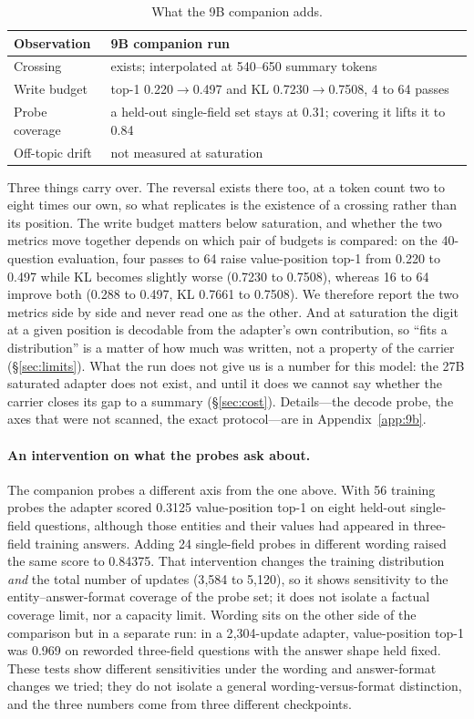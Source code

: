 \documentclass[sigconf,nonacm]{acmart}
\begin{document}
\begin{table}[t]
\centering
\small
\begin{tabular}{@{}l>{\raggedright\arraybackslash}p{5.3cm}@{}}
\toprule
Observation & 9B companion run \\
\midrule
Crossing & exists; interpolated at 540--650 summary tokens \\
Write budget & top-1 0.220$\to$0.497 and KL 0.7230$\to$0.7508, 4 to 64 passes \\
Probe coverage & a held-out single-field set stays at 0.31; covering it lifts it to 0.84 \\
Off-topic drift & not measured at saturation \\
\bottomrule
\end{tabular}
\caption{What the 9B companion adds.}
\label{tab:9b}
\end{table}

Three things carry over. The reversal exists there too, at a token count two to eight times our own, so what
replicates is the existence of a crossing rather than its position. The write budget matters below saturation, and
whether the two metrics move together depends on which pair of budgets is compared: on the 40-question evaluation,
four passes to 64 raise value-position top-1 from 0.220 to 0.497 while KL becomes slightly worse (0.7230 to
0.7508), whereas 16 to 64 improve both (0.288 to 0.497, KL 0.7661 to 0.7508). We therefore report the two metrics
side by side and never read one as the other. And at saturation the digit at a given position is
decodable from the adapter's own contribution, so ``fits a distribution'' is a matter of how much was written, not
a property of the
carrier (\S\ref{sec:limits}). What the run does not give us is a number for this model: the
27B saturated adapter does not exist, and until it does we cannot say whether the carrier closes its gap to a
summary (\S\ref{sec:cost}). Details---the decode probe, the axes that were not scanned, the exact protocol---are
in Appendix~\ref{app:9b}.

\paragraph{An intervention on what the probes ask about.} The companion probes a different axis from the one above.
With 56 training probes the adapter scored 0.3125 value-position top-1 on eight held-out single-field questions,
although those entities and their values had appeared in three-field training answers. Adding 24 single-field
probes in different wording raised the same score to 0.84375. That intervention changes the training distribution
\emph{and} the total number of updates (3{,}584 to 5{,}120), so it shows sensitivity to the entity--answer-format
coverage of the probe set; it does not isolate a factual coverage limit, nor a capacity limit. Wording sits on the other side of the comparison but in a separate run: in a 2{,}304-update
adapter, value-position top-1 was 0.969 on reworded three-field questions with the answer shape held fixed. These
tests show different sensitivities under the wording and answer-format changes we tried; they do not isolate a
general wording-versus-format distinction, and the three numbers come from three different checkpoints.
\end{document}
